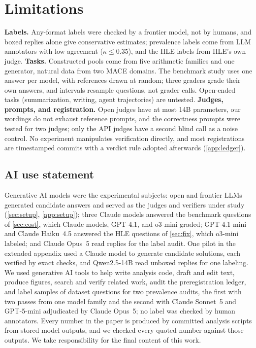 \documentclass{article}
\begin{document}
\section{Limitations}
\label{sec:limits}

\textbf{Labels.} Any-format labels were checked by a frontier model, not by humans, and boxed replies alone give conservative estimates; prevalence labels come from LLM annotators with low agreement ($\kappa \le 0.35$), and the HLE labels from HLE's own judge.
\textbf{Tasks.} Constructed pools come from five arithmetic families and one generator, natural data from two \textsc{MACE} domains. The benchmark study uses one answer per model, with references drawn at random; three graders grade their own answers, and intervals resample questions, not grader calls. Open-ended tasks (summarization, writing, agent trajectories) are untested.
\textbf{Judges, prompts, and registration.} Open judges have at most 14B parameters, our wordings do not exhaust reference prompts, and the correctness prompts were tested for two judges; only the API judges have a second blind call as a noise control. No experiment manipulates verification directly, and most registrations are timestamped commits with a verdict rule adopted afterwards (\cref{app:ledger}).

\subsection*{AI use statement}
Generative AI models were the experimental subjects: open and frontier LLMs generated candidate answers and served as the judges and verifiers under study (\cref{sec:setup}, \cref{app:setup}); three Claude models answered the benchmark questions of \cref{sec:cost}, which Claude models, GPT-4.1, and o3-mini graded; GPT-4.1-mini and Claude Haiku~4.5 answered the HLE questions of \cref{sec:fix}, which o3-mini labeled; and Claude Opus~5 read replies for the label audit. One pilot in the extended appendix used a Claude model to generate candidate solutions, each verified by exact checks, and Qwen2.5-14B read unboxed replies for one labeling. We used generative AI tools to help write analysis code, draft and edit text, produce figures, search and verify related work, audit the preregistration ledger, and label samples of dataset questions for two prevalence audits, the first with two passes from one model family and the second with Claude Sonnet~5 and GPT-5-mini adjudicated by Claude Opus~5; no label was checked by human annotators. Every number in the paper is produced by committed analysis scripts from stored model outputs, and we checked every quoted number against those outputs. We take responsibility for the final content of this work.
\end{document}
